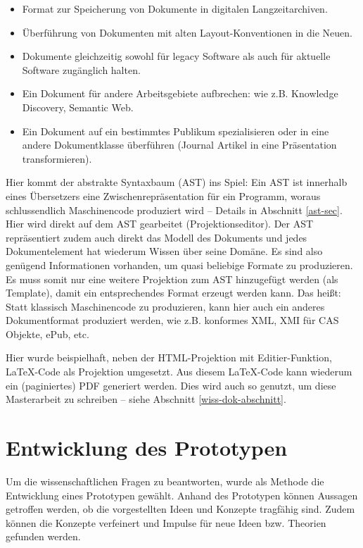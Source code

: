  
\begin{itemize}

\item Format zur Speicherung von Dokumente in digitalen Langzeitarchiven.
\item Überführung von Dokumenten mit alten Layout-Konventionen in die Neuen.
\item Dokumente gleichzeitig sowohl für legacy Software als auch für aktuelle Software zugänglich halten.
\item Ein Dokument für andere Arbeitsgebiete aufbrechen: wie z.B. Knowledge Discovery, Semantic Web.
\item Ein Dokument auf ein bestimmtes Publikum spezialisieren oder in eine andere Dokumentklasse überführen (Journal Artikel in eine Präsentation transformieren).
\end{itemize}
 
Hier kommt der abstrakte Syntaxbaum (AST) ins Spiel: Ein AST ist innerhalb eines Übersetzers eine Zwischenrepräsentation für ein Programm, woraus schlussendlich Maschinencode produziert wird -- Details in Abschnitt \ref{ast-sec}. Hier wird direkt auf dem AST gearbeitet (Projektionseditor). Der AST repräsentiert zudem auch direkt das Modell des Dokuments und jedes Dokumentelement hat wiederum Wissen über seine Domäne. Es sind also genügend Informationen vorhanden, um quasi beliebige Formate zu produzieren. Es muss somit nur eine weitere Projektion zum AST hinzugefügt werden (als Template), damit ein entsprechendes Format erzeugt werden kann. Das heißt: Statt klassisch Maschinencode zu produzieren, kann hier auch ein anderes Dokumentformat produziert werden, wie z.B. \citep{NISO} konformes XML, XMI für CAS Objekte, ePub, etc.

 
Hier wurde beispielhaft, neben der HTML-Projektion mit Editier-Funktion, LaTeX-Code als Projektion umgesetzt. Aus diesem LaTeX-Code kann wiederum ein (paginiertes) PDF generiert werden. Dies wird auch so genutzt, um diese Masterarbeit zu schreiben -- siehe Abschnitt \ref{wiss-dok-abschnitt}.

 
\chapter{Entwicklung des Prototypen}\label{}
 
Um die wissenschaftlichen Fragen zu beantworten, wurde als Methode die Entwicklung eines Prototypen gewählt. Anhand des Prototypen können Aussagen getroffen werden, ob die vorgestellten Ideen und Konzepte tragfähig sind. Zudem können die Konzepte verfeinert und Impulse für neue Ideen bzw. Theorien gefunden werden.

